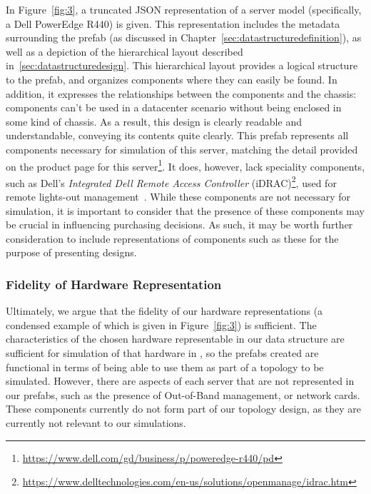 \documentclass[11pt]{article}
\begin{document}
			In Figure~\ref{fig:3}, a truncated JSON representation of a server model (specifically, a Dell PowerEdge R440) is given.
			This representation includes the metadata surrounding the prefab (as discussed in Chapter~\ref{sec:datastructuredefinition}), as well as a depiction of the hierarchical layout described in~\ref{sec:datastructuredesign}.
			This hierarchical layout provides a logical structure to the prefab, and organizes components where they can easily be found.
			In addition, it expresses the relationships between the components and the chassis: components can't be used in a datacenter scenario without being enclosed in some kind of chassis.
			As a result, this design is clearly readable and understandable, conveying its contents quite clearly.
			This prefab represents all components necessary for simulation of this server, matching the detail provided on the product page for this server\footnote{\url{https://www.dell.com/gd/business/p/poweredge-r440/pd}}.
			It does, however, lack speciality components, such as Dell's \textit{Integrated Dell Remote Access Controller} (iDRAC)\footnote{\url{https://www.delltechnologies.com/en-us/solutions/openmanage/idrac.htm}}, used for remote lights-out management~\cite{Bonkoski2013}.
			While these components are not necessary for simulation, it is important to consider that the presence of these components may be crucial in influencing purchasing decisions.
			As such, it may be worth further consideration to include representations of components such as these for the purpose of presenting designs.



		\subsubsection{Fidelity of Hardware Representation}
			Ultimately, we argue that the fidelity of our hardware representations (a condensed example of which is given in Figure~\ref{fig:3}) is sufficient.
			The characteristics of the chosen hardware representable in our data structure are sufficient for simulation of that hardware in \opendc{}, so the prefabs created are functional in terms of being able to use them as part of a topology to be simulated.
			However, there are aspects of each server that are not represented in our prefabs, such as the presence of Out-of-Band management, or network cards.
			These components currently do not form part of our topology design, as they are currently not relevant to our simulations.
\end{document}
